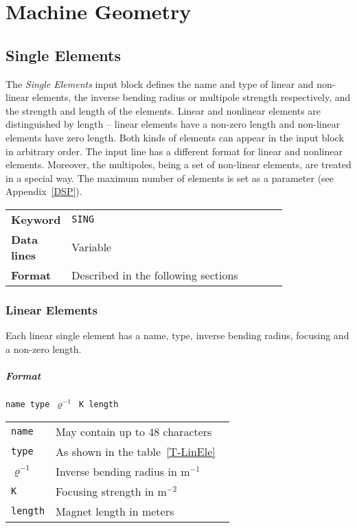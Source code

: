 
\chapter{Machine Geometry} \label{MaGe}

\section{Single Elements} \label{SinEle}

The \textit{Single Elements} input block defines the name and type of linear and non-linear elements, the inverse bending radius or multipole strength respectively, and the strength and length of the elements.
Linear and nonlinear elements are distinguished by length -- linear elements have a non-zero length and non-linear elements have zero length.
Both kinds of elements can appear in the input block in arbitrary order.
The input line has a different format for linear and nonlinear elements.
Moreover, the multipoles, being a set of non-linear elements, are treated in a special way.
The maximum number of elements is set as a parameter (see Appendix~\ref{DSP}).

\bigskip
\begin{tabular}{@{}lp{0.8\linewidth}}
    \textbf{Keyword}    & \texttt{SING} \\
    \textbf{Data lines} & Variable \\
    \textbf{Format}     & Described in the following sections
\end{tabular}

\subsection{Linear Elements} \label{LinEle}

Each linear single element has a name, type, inverse bending radius, focusing and a non-zero length.

\paragraph{Format} \texttt{name type $ \varrho^{-1} $ K length}

\bigskip
\begin{tabular}{@{}lp{0.8\linewidth}}
    \texttt{name} & May contain up to 48 characters \\
    \texttt{type} & As shown in the table~\ref{T-LinEle} \\
    \texttt{$ \varrho^{-1}$} &  Inverse bending radius in $\mathrm{m}^{-1}$ \\
    \texttt{K} & Focusing strength in $\mathrm{m}^{-2}$ \\
    \texttt{length} & Magnet length in meters
\end{tabular}

